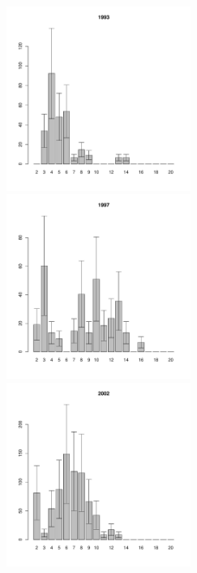 \documentclass[12pt, a4paper]{article}
\begin{document}
\begin{figure}[h]
\begin{multicols}{3}
\hfill
\includegraphics[width=60mm]{../White_Sea/Luvenga_II_razrez/high_beatch2_1993_.pdf}
\hfill
\includegraphics[width=60mm]{../White_Sea/Luvenga_II_razrez/high_beatch2_1997_.pdf}
\hfill
\includegraphics[width=60mm]{../White_Sea/Luvenga_II_razrez/high_beatch2_2002_.pdf}
\end{multicols}



\end{figure}
\end{document}
